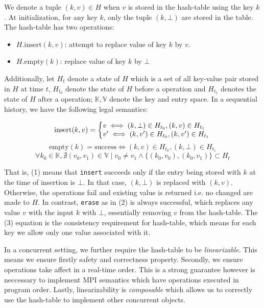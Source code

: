 We denote a tuple $(k,v) \in H$ when $v$ is stored in the hash-table using the
key $k$. At initialization, for any key $k$, only the tuple $(k,\bot)$ are
stored in the table. The hash-table has two operations: 

\begin{itemize}
  \item $H.\text{insert}(k,v)$: attempt to replace value of key $k$ by $v$.
  \item $H.\text{empty}(k)$: replace value of key $k$ by $\bot$
\end{itemize}

Additionally, let $H_t$ denote a state of $H$ which is a set of all key-value
pair stored in $H$ at time $t$, $H_{t_0}$ denote the state of $H$ before a
operation and $H_{t_1}$ denotes the state of $H$ after a operation;
$\mathbb{K}, \mathbb{V}$ denote the key and entry space. In a sequential
history, we have the following legal semantics:

\begin{equation}
  \text{insert}(k, v) = \left\{
    \begin{array}{@{}l@{\thinspace}l}
      v \iff (k,\bot) \in H_{t_0}, (k,v) \in H_{t_1}\\
      v' \iff (k,v') \in H_{t_0}, (k,v') \in H_{t_1}
    \end{array}
    \right.
\end{equation}
\begin{equation}
  \text{empty}(k) = \text{success} \iff  (k,v) \in H_{t_0}, (k,\bot) \in H_{t_1}
\end{equation}
\begin{equation}
  \forall k_0 \in \mathbb{K}, \nexists {(v_0, v_1) \in \mathbb{V}}
  \mid {{v_0 \ne v_1} \wedge \{(k_0, v_0), (k_0, v_1)\} \subset H_{t}}
\end{equation}

That is, (1) means that \texttt{insert} succeeds only if the entry being stored
with $k$ at the time of insertion is $\bot$.  In that case, $(k,\bot)$ is
replaced with $(k, v)$. Otherwise, the operations fail and existing value is
returned i.e. no changed are made to $H$. In contrast, \texttt{erase} as in (2)
is always successful, which replaces any value $v$ with the input $k$ with
$\bot$, essentially removing $v$ from the hash-table. The (3) equation is the
consistency requirement for hash-table, which means for each key we allow
only one value associated with it.

In a concurrent setting, we further require the hash-table to be
\textit{linearizable}.  This means we ensure firstly safety and correctness
property. Secondly, we ensure operations take affect in a real-time order.
This is a strong guarantee however is neccessary to implement MPI semantics
which have operations executed in program order. Lastly, linearizability is
\textit{composable} which allows us to correctly use the hash-table to
implement other concurrent objects.

